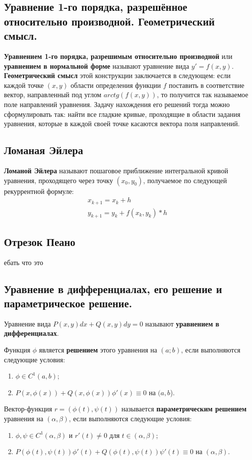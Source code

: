 \documentclass{article}
\begin{document}
\subsection{Уравнение 1-го порядка, разрешённое относительно производной. Геометрический смысл.}
\textbf{Уравнением 1-го порядка, разрешимым относительно производной} или \textbf{уравнением в нормальной форме} называют уравнение вида $y' = f(x, y)$. \textbf{Геометрический смысл} этой конструкции заключается в следующем: если каждой точке $(x, y)$ области определения функции $f$ поставить в соответствие вектор, направленный под углом $arctg(f(x, y))$, то получится так называемое поле направлений уравнения. Задачу нахождения его решений тогда можно сформулировать так: найти все гладкие кривые, проходящие в области задания уравнения, которые в каждой своей точке касаются вектора поля направлений.

\subsection{Ломаная Эйлера}
\textbf{Ломаной Эйлера} называют пошаговое приближение интегральной кривой уравнения, проходящего через точку $(x_0, y_0)$, получаемое по следующей рекуррентной формуле: 
\begin{gather*}
    x_{k+1} = x_k + h\\
    y_{k+1} = y_k + f(x_k, y_k) * h
\end{gather*}

\subsection{Отрезок Пеано}
ебать что это

\subsection{Уравнение в дифференциалах, его решение и параметрическое решение.}
Уравнение вида $P(x, y)dx + Q(x, y)dy = 0$ называют \textbf{уравнением в дифференциалах}.

Функция $\phi$ является \textbf{решением} этого уравнения на $(a; b)$, если выполняются следующие условия:
\begin{enumerate}
    \item $\phi \in C^1(a, b)$;
    \item $P(x, \phi(x)) + Q(x, \phi(x))\phi'(x) \equiv 0$ на $(a, b$).
\end{enumerate}

Вектор-функция $r = (\phi(t), \psi(t))$ называется \textbf{параметрическим решением} уравнения на $(\alpha, \beta)$, если выполняются следующие условия:
\begin{enumerate}
    \item $\phi, \psi \in C^1(\alpha, \beta)$ и $r'(t) \neq 0$ для $t \in (\alpha, \beta)$;
    \item $P(\phi(t), \psi(t))\phi'(t) + Q(\phi(t), \psi(t))\psi'(t) \equiv 0$ на $(\alpha, \beta)$.
\end{enumerate}
\end{document}
